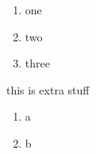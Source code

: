 \documentclass[11pt]{article}
\newcounter{temp}
\begin{document}
\begin{enumerate}
  \item one
  \item two
  \item three
\end{enumerate}

this is extra stuff


\setcounter{temp}{\theenumi}
\begin{enumerate} \setcounter{enumi}{\thetemp}
  \item a
  \item b
\end{enumerate}
\end{document}
